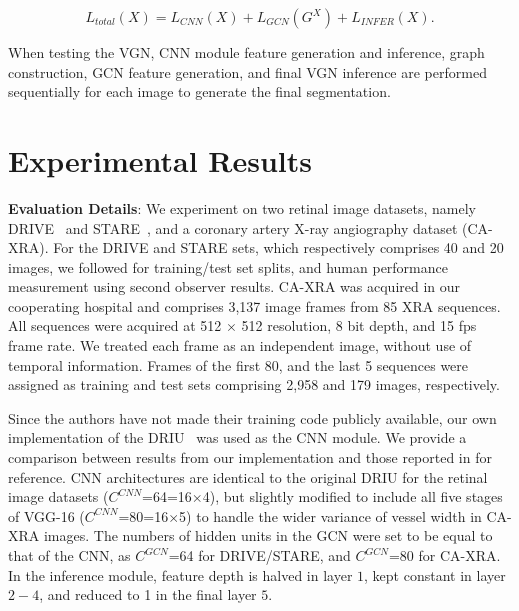 \documentclass[runningheads,a4paper]{llncs}
\begin{document}
\begin{equation}
\label{eq:total_loss}
L_{total}(X) = L_{CNN}(X) + L_{GCN}(G^{X}) + L_{INFER}(X).
\end{equation}

When testing the VGN, CNN module feature generation and inference, graph construction, GCN feature generation, and final VGN inference are performed sequentially for each image to generate the final segmentation. 

\section{Experimental Results}

\textbf{Evaluation Details}:
We experiment on two retinal image datasets, namely DRIVE~\cite{staal04} and STARE~\cite{hoover00}, and a coronary artery X-ray angiography dataset (CA-XRA). For the DRIVE and STARE sets, which respectively comprises 40 and 20 images, we followed \cite{maninis16} for training/test set splits, and human performance measurement using second observer results. CA-XRA was acquired in our cooperating hospital and comprises 3,137 image frames from 85 XRA sequences. All sequences were acquired at 512 $\times$ 512 resolution, 8 bit depth, and 15 fps frame rate. We treated each frame as an independent image, without use of temporal information. Frames of the first 80, and the last 5 sequences were assigned as training and test sets comprising 2,958 and 179 images, respectively.

Since the authors have not made their training code publicly available, our own implementation of the DRIU~\cite{maninis16} was used as the CNN module. We provide a comparison between results from our implementation and those reported in \cite{maninis16} for reference. CNN architectures are identical to the original DRIU for the retinal image datasets ($C^{CNN}$=64=16$\times$4), but slightly modified to include all five stages of VGG-16 ($C^{CNN}$=80=16$\times$5) to handle the wider variance of vessel width in CA-XRA images.
The numbers of hidden units in the GCN were set to be equal to that of the CNN, as $C^{GCN}$=64 for DRIVE/STARE, and $C^{GCN}$=80 for CA-XRA. In the inference module, feature depth is halved in layer $1$, kept constant in layer $2-4$, and reduced to 1 in the final layer $5$.
\end{document}
